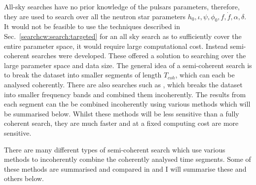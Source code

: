 All-sky searches have no prior knowledge of the pulsars parameters, therefore,
they are used to search over all the neutron star parameters $h_0, \iota, \psi, \phi_0, f,
\dot{f}, \alpha, \delta$. It would not be feasible to use the techniques described in
Sec.~\ref{searchcw:search:targeted} for an all sky search as to sufficiently
cover the entire parameter space, it would require large computational cost.  Instead
semi-coherent searches were developed.  These offered a solution to searching over
the large parameter space and data size.  The general idea of a semi-coherent
search is to break the dataset into smaller segments of length $T_{coh}$, which
can each be analysed coherently. There are also searches such as \citep{messenger2007FastSearch}, which breaks the dataset into smaller frequency bands and combined them incoherently. 
The results from each segment can the be combined incoherently using various methods which will be
summarised below.  
Whilst these methods will be less sensitive than a fully coherent search, they are much faster and at a fixed computing cost are more sensitive.

There are many different types of semi-coherent search which use various
methods to incoherently combine the coherently analysed time segments.  Some of these methods are summarised and compared in
\citep{walsh2016ComparisonMethods} and I will summarise these and others below.


